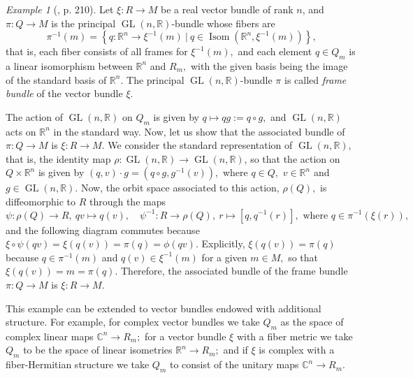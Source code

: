 \documentclass[12pt, letterpaper, reqno]{amsart}
\theoremstyle{definition}
\theoremstyle{plain}
\theoremstyle{remark}
\newtheorem{ex}{Example}
\begin{document}
\begin{ex}[\cite{montgomery2002tour}, p. 210]
	Let $ \xi: R \rightarrow M $ be a real vector bundle of rank $ n $, and $ \pi: Q \rightarrow M $ is the principal $ \operatorname{GL}(n, \mathbb{R})  $-bundle whose fibers are $$ \pi^{-1}(m) = \left\{ q: \mathbb{R}^n \rightarrow \xi^{-1}(m) \ | \ q\in \operatorname{Isom}( \mathbb{R}^n, \xi^{-1}(m)) \right\},  $$ that is, each fiber consists of all frames for $ \xi^{-1}(m), $ and each element $ q\in Q_m $ is a linear isomorphism between $ \mathbb{R}^n $ and $ R_m, $ with the given basis being the image of the standard basis of $ \mathbb{R}^n. $ The principal $ \operatorname{GL} (n, \mathbb{R}) $-bundle $ \pi $ is called \textit{frame bundle} of the vector bundle $ \xi $.

	The action of $ \operatorname{GL} (n, \mathbb{R})$ on $ Q_m $ is given by $ q\mapsto qg:=q\circ g, $ and $ \operatorname{GL} (n, \mathbb{R}) $ acts on $ \mathbb{R}^n $ in the standard way. Now, let us show that the associated bundle of $ \pi: Q \rightarrow M $ is $ \xi: R \rightarrow M. $ We consider the standard representation of $ \operatorname{GL} (n, \mathbb{R}), $ that is, the identity map $ \rho: \operatorname{GL} (n, \mathbb{R}) \rightarrow \operatorname{GL} (n, \mathbb{R}) $, so that the action on $ Q \times \mathbb{R}^n$ is given by $ (q,v)\cdot g = (q\circ g, g^{-1}(v)),$ where $ q\in Q, $ $ v\in \mathbb{R}^n $ and $ g\in \operatorname{GL} (n, \mathbb{R}). $ Now, the orbit space associated to this action, $ \rho(Q), $ is diffeomorphic to $ R $ through the maps
	$$ \psi: \rho(Q) \rightarrow R, \ qv\mapsto q(v), \quad \psi^{-1}: R \rightarrow \rho(Q), \ r \mapsto [q,q^{-1}(r)], \text{ where }q\in \pi^{-1}(\xi(r)), $$ 
	and the following diagram commutes because $ \xi\circ \psi(qv)=\xi(q(v))=\pi(q)=\phi(qv).$ Explicitly, $ \xi(q(v))=\pi(q) $ because $ q\in\pi^{-1}(m) $ and $ q(v)\in \xi^{-1}(m) $ for a given $ m\in M, $ so that $ \xi(q(v))=m=\pi(q). $ Therefore, the associated bundle of the frame bundle $ \pi: Q \rightarrow M $ is $ \xi : R \rightarrow M. $ 
	\begin{center}
	\end{center}

	This example can be extended to vector bundles endowed with additional structure. For example, for complex vector bundles we take $ Q_m $ as the space of complex linear maps $ \mathbb{C}^n \rightarrow  R_m; $ for a vector bundle $ \xi $ with a fiber metric we take $ Q_m $ to be the space of linear isometries $ \mathbb{R}^n \rightarrow R_m; $ and if $ \xi $ is complex with a fiber-Hermitian structure we take $ Q_m $ to consist of the unitary maps $ \mathbb{C}^n \rightarrow R_m. $ 
\end{ex}
\end{document}
